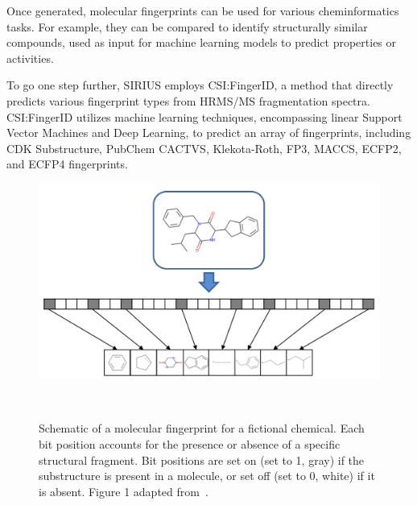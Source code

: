 Once generated, molecular fingerprints can be used for various cheminformatics tasks. For example, they can be compared to identify structurally similar compounds, used as input for machine learning models to predict properties or activities.

To go one step further, SIRIUS employs CSI:FingerID, a method that directly predicts various fingerprint types from HRMS/MS fragmentation spectra. CSI:FingerID utilizes machine learning techniques, encompassing linear Support Vector Machines and Deep Learning, to predict an array of fingerprints, including CDK Substructure, PubChem CACTVS, Klekota-Roth, FP3, MACCS, ECFP2, and ECFP4 fingerprints.


\begin{figure}[htbp]  %
    \centering
    \includegraphics[width=1.0\textwidth]{figures/fingerprint_schema.png}  
    \caption{Schematic of a molecular fingerprint for a fictional chemical. Each bit position accounts for the presence or absence of a specific structural fragment. Bit positions are set on (set to 1, gray) if the substructure is present in a molecule, or set off (set to 0, white) if it is absent. Figure 1 adapted from~\cite{janela2022}.}
~\label{fig:fingerprint_schema} 
\end{figure}

